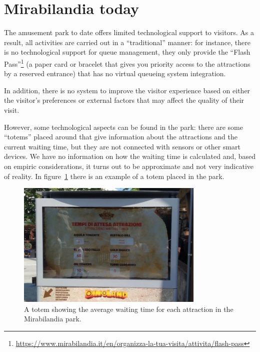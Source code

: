 \section{Mirabilandia today}\label{sec:mirabilandia-today}
The amusement park to date offers limited technological support to visitors.
As a result, all activities are carried out in a ``traditional'' manner:
for instance, there is no technological support for queue management, they only provide the
``Flash Pass''\footnote{\url{https://www.mirabilandia.it/en/organizza-la-tua-visita/attivita/flash-pass}} (a paper card or bracelet that gives you
priority access to the attractions by a reserved entrance) that has no virtual queueing system integration.

In addition, there is no system to improve the visitor experience based on either the visitor's preferences or external factors that may affect the
quality of their visit.

However, some technological aspects can be found in the park:
there are some ``totems'' placed around that give information about the attractions and the current waiting time, but they are not connected with sensors or other smart devices.
We have no information on how the waiting time is calculated and, based on empiric considerations, it turns out to be approximate and not very indicative of reality.
In figure~\ref{fig:mira-totem} there is an example of a totem placed in the park.

\begin{figure}[H]
	\centering
	\includegraphics[width=0.8\textwidth]{img/mira-totem.jpg}
	\caption{A totem showing the average waiting time for each attraction in the Mirabilandia park.}
	\label{fig:mira-totem}
\end{figure}

